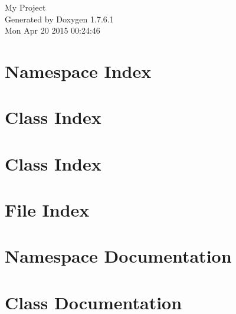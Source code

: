 \documentclass[a4paper]{book}
\begin{document}
\hypersetup{pageanchor=false,citecolor=blue}
\begin{titlepage}
\vspace*{7cm}
\begin{center}
{\Large \-My \-Project }\\
\vspace*{1cm}
{\large \-Generated by Doxygen 1.7.6.1}\\
\vspace*{0.5cm}
{\small Mon Apr 20 2015 00:24:46}\\
\end{center}
\end{titlepage}
\clearemptydoublepage
{}
\tableofcontents
\clearemptydoublepage
{}
\hypersetup{pageanchor=true,citecolor=blue}
\chapter{\-Namespace \-Index}

\chapter{\-Class \-Index}

\chapter{\-Class \-Index}

\chapter{\-File \-Index}

\chapter{\-Namespace \-Documentation}

\chapter{\-Class \-Documentation}














\end{document}
